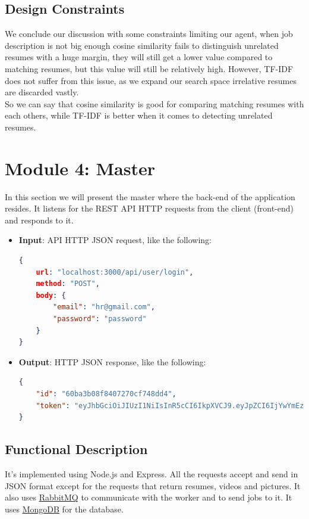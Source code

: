 \subsection{Design Constraints}
We conclude our discussion with some constraints limiting our agent, when job description is not big enough cosine similarity fails to distinguish unrelated resumes with a huge margin, they will still get a lower value compared to matching resumes, but this value will still be relatively high. However, TF-IDF does not suffer from this issue, as we expand our search space irrelative resumes are discarded vastly.\\

So we can say that cosine similarity is good for comparing matching resumes with each others, while TF-IDF is better when it comes to detecting unrelated resumes.    


\newpage
\section{Module 4: Master}
\label{sec:module_4}
In this section we will present the master where the back-end of the application resides. 
It listens for the REST API HTTP requests from the client (front-end) and responds to it. 

\begin{itemize}
    \item \textbf{Input}: API HTTP JSON request, like the following:
    \begin{lstlisting}[language=json,firstnumber=1]
{
    url: "localhost:3000/api/user/login",
    method: "POST",
    body: {
        "email": "hr@gmail.com",
        "password": "password"
    }
}
    \end{lstlisting}
    \item \textbf{Output}: HTTP JSON response, like the following:
    \begin{lstlisting}[language=json,firstnumber=1]
{
    "id": "60ba3b08f8407270cf748dd4",
    "token": "eyJhbGciOiJIUzI1NiIsInR5cCI6IkpXVCJ9.eyJpZCI6IjYwYmEzYjA4Zjg0MDcyNzBjZjc0OGRkNCIsImlhdCI6MTYyNjk2OTI4OCwiZXhwIjoxNjI3MDU1Njg4fQ.1BzoeIYRWdQDG9gQ9athYvShrZuKlcoOZ9nliSuPFCI"
}
    \end{lstlisting}
\end{itemize}

\subsection{Functional Description}
It's implemented using Node.js and Express. 
All the requests accept and send in JSON format except for the requests that return resumes, videos and pictures.
It also uses \href{https://www.rabbitmq.com/}{\underline{RabbitMQ}} to communicate with the worker and to send jobs to it.
It uses \href{https://www.mongodb.com/}{\underline{MongoDB}} for the database.


